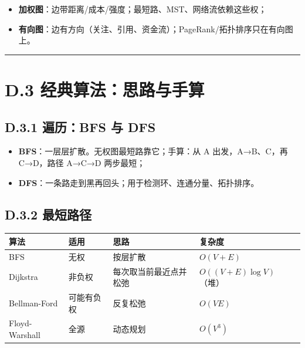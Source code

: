 \begin{itemize}
\tightlist
\item
  \textbf{加权图}：边带距离/成本/强度；最短路、MST、网络流依赖这些权；
\item
  \textbf{有向图}：边有方向（关注、引用、资金流）；PageRank/拓扑排序只在有向图上。
\end{itemize}

\begin{center}\rule{0.5\linewidth}{0.5pt}\end{center}

\section{D.3
经典算法：思路与手算}\label{d.3-ux7ecfux5178ux7b97ux6cd5ux601dux8defux4e0eux624bux7b97}

\subsection{D.3.1 遍历：BFS 与
DFS}\label{d.3.1-ux904dux5386bfs-ux4e0e-dfs}

\begin{itemize}
\tightlist
\item
  \textbf{BFS}：一层层扩散。无权图最短路靠它；手算：从 A
  出发，A→B、C，再 C→D，路径 A→C→D 两步最短；
\item
  \textbf{DFS}：一条路走到黑再回头；用于检测环、连通分量、拓扑排序。
\end{itemize}

\subsection{D.3.2 最短路径}\label{d.3.2-ux6700ux77edux8defux5f84}

{\def\LTcaptype{none} %
\begin{longtable}[]{@{}llll@{}}
\toprule\noalign{}
算法 & 适用 & 思路 & 复杂度 \\
\midrule\noalign{}
\endhead
\bottomrule\noalign{}
\endlastfoot
BFS & 无权 & 按层扩散 & \(O(V+E)\) \\
Dijkstra & 非负权 & 每次取当前最近点并松弛 & \(O((V+E)\log V)\)（堆） \\
Bellman-Ford & 可能有负权 & 反复松弛 & \(O(VE)\) \\
Floyd-Warshall & 全源 & 动态规划 & \(O(V^3)\) \\
\end{longtable}
}

